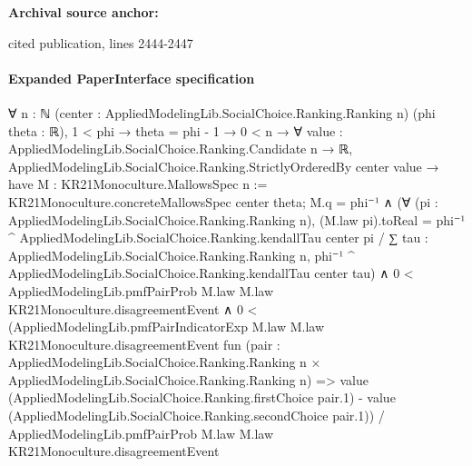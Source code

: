 \documentclass[10pt]{article}
\begin{document}
\textbf{Archival source anchor:} {\footnotesize\raggedright cited publication, lines 2444-\allowbreak{}2447\par}
\paragraph{Expanded PaperInterface specification}
\begin{ReviewVerbatim}
∀ {n : ℕ} (center : AppliedModelingLib.SocialChoice.Ranking.Ranking n) (phi theta : ℝ),
  1 < phi →
    theta = phi - 1 →
      0 < n →
        ∀ {value : AppliedModelingLib.SocialChoice.Ranking.Candidate n → ℝ},
          AppliedModelingLib.SocialChoice.Ranking.StrictlyOrderedBy center value →
            have M : KR21Monoculture.MallowsSpec n := KR21Monoculture.concreteMallowsSpec center theta;
            M.q = phi⁻¹ ∧
              (∀ (pi : AppliedModelingLib.SocialChoice.Ranking.Ranking n),
                  (M.law pi).toReal =
                    phi⁻¹ ^ AppliedModelingLib.SocialChoice.Ranking.kendallTau center pi /
                      ∑ tau : AppliedModelingLib.SocialChoice.Ranking.Ranking n,
                        phi⁻¹ ^ AppliedModelingLib.SocialChoice.Ranking.kendallTau center tau) ∧
                0 < AppliedModelingLib.pmfPairProb M.law M.law KR21Monoculture.disagreementEvent ∧
                  0 <
                    (AppliedModelingLib.pmfPairIndicatorExp M.law M.law KR21Monoculture.disagreementEvent
                        fun
                          (pair :
                            AppliedModelingLib.SocialChoice.Ranking.Ranking n ×
                              AppliedModelingLib.SocialChoice.Ranking.Ranking n) =>
                        value (AppliedModelingLib.SocialChoice.Ranking.firstChoice pair.1) -
                          value (AppliedModelingLib.SocialChoice.Ranking.secondChoice pair.1)) /
                      AppliedModelingLib.pmfPairProb M.law M.law KR21Monoculture.disagreementEvent
\end{ReviewVerbatim}
\end{document}
